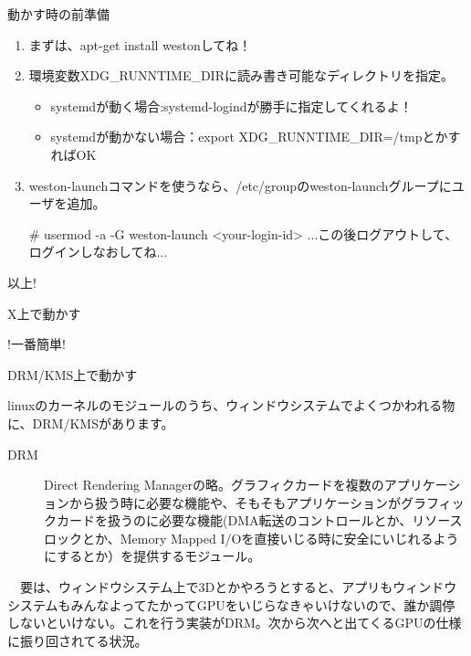 \begin{frame}[containsverbatim]{動かす時の前準備}

\begin{enumerate}
\item まずは、apt-get install westonしてね！
\item 環境変数XDG\_RUNNTIME\_DIRに読み書き可能なディレクトリを指定。\\
\begin{itemize}
\item systemdが動く場合:systemd-logindが勝手に指定してくれるよ！
\item systemdが動かない場合：export XDG\_RUNNTIME\_DIR=/tmpとかすればOK
\end{itemize}
\item weston-launchコマンドを使うなら、/etc/groupのweston-launchグループにユーザを追加。\\
\begin{commandline}
# usermod -a -G weston-launch <your-login-id>
...この後ログアウトして、ログインしなおしてね...
\end{commandline}
\end{enumerate}
\begin{center}
以上!
\end{center}
\end{frame}

\begin{frame}[containsverbatim]{X上で動かす}
\begin{center}
!一番簡単!
\end{center}
\end{frame}

\begin{frame}{DRM/KMS上で動かす}

 linuxのカーネルのモジュールのうち、ウィンドウシステムでよくつかわれる物に、DRM/KMSがあります。

\begin{description}
\item [DRM] Direct Rendering Managerの略。グラフィクカードを複数のアプリケーションから扱う時に必要な機能や、そもそもアプリケーションがグラフィックカードを扱うのに必要な機能(DMA転送のコントロールとか、リソースロックとか、Memory Mapped I/Oを直接いじる時に安全にいじれるようにするとか）を提供するモジュール。
\end{description}

　要は、ウィンドウシステム上で3Dとかやろうとすると、アプリもウィンドウシステムもみんなよってたかってGPUをいじらなきゃいけないので、誰か調停しないといけない。これを行う実装がDRM。次から次へと出てくるGPUの仕様に振り回されてる状況。


\end{frame}

